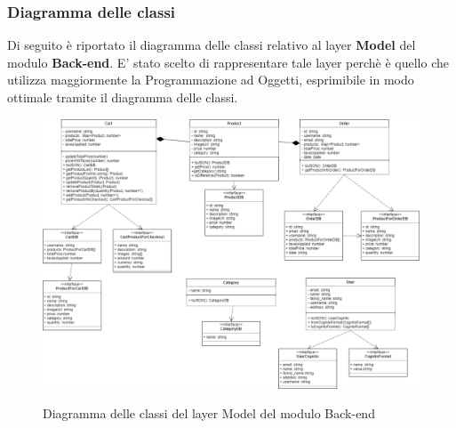 \subsubsection{Diagramma delle classi}
Di seguito è riportato il diagramma delle classi relativo al layer \textbf{Model} del modulo \textbf{Back-end}. E' stato scelto di rappresentare tale layer perchè è quello che utilizza maggiormente la Programmazione ad Oggetti, esprimibile in modo ottimale tramite il diagramma delle classi.

\vspace{1cm}

\begin{figure}[H]
\centering
\includegraphics[scale=0.35]{res/Architettura/Backend/img/diagrammaClassiBack-end.png}\\
\caption{Diagramma delle classi del layer Model del modulo Back-end}
\end{figure}